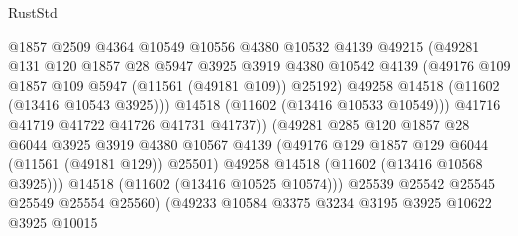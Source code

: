 \begin{lexlean}{RustStd}
\begin{coremodule}
                                  @1857
                                  @2509
                                  @4364
                                  @10549
                                  @10556
                                  @4380
                                  @10532
                                  @4139
                                  @49215
                                  (@49281
                                    @131
                                    @120
                                    @1857
                                    @28
                                    @5947
                                    @3925
                                    @3919
                                    @4380
                                    @10542
                                    @4139
                                    (@49176 @109 @1857 @109 @5947 (@11561 (@49181 @109)) @25192)
                                    @49258
                                    @14518
                                    (@11602 (@13416 @10543 @3925)))
                                  @14518
                                  (@11602 (@13416 @10533 @10549)))
                                @41716
                                @41719
                                @41722
                                @41726
                                @41731
                                @41737))
                            (@49281
                              @285
                              @120
                              @1857
                              @28
                              @6044
                              @3925
                              @3919
                              @4380
                              @10567
                              @4139
                              (@49176 @129 @1857 @129 @6044 (@11561 (@49181 @129)) @25501)
                              @49258
                              @14518
                              (@11602 (@13416 @10568 @3925)))
                            @14518
                            (@11602 (@13416 @10525 @10574)))
                          @25539
                          @25542
                          @25545
                          @25549
                          @25554
                          @25560)
                        (@49233
                          @10584
                          @3375
                          @3234
                          @3195
                          @3925
                          @10622
                          @3925
                          @10015

\end{coremodule}
\end{lexlean}
